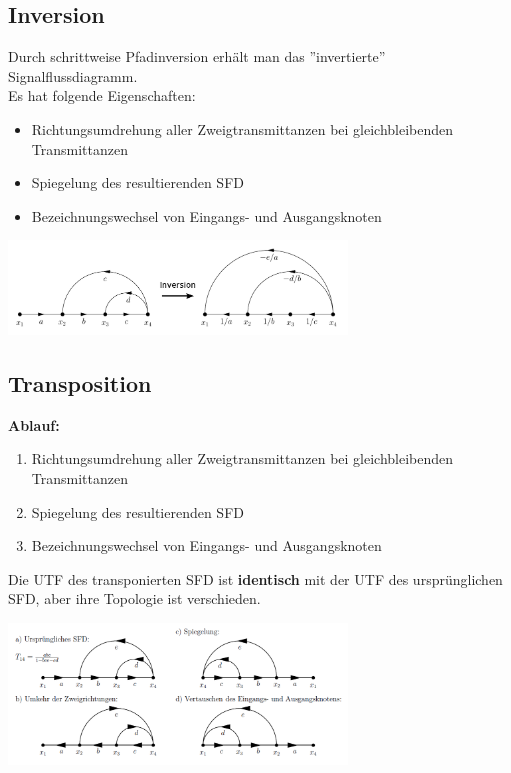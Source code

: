 \subsection{Inversion }
	Durch schrittweise Pfadinversion erhält man das ”invertierte” Signalflussdiagramm. \\
	Es hat folgende Eigenschaften:
	\begin{multicols}{2}
		\begin{itemize}
			\item Richtungsumdrehung aller Zweigtransmittanzen bei gleichbleibenden Transmittanzen
			\item Spiegelung des resultierenden SFD
			\item Bezeichnungswechsel von Eingangs- und Ausgangsknoten
		\end{itemize}
		\columnbreak
		\includegraphics[width=9cm]{./bilder/inversion.png}
	\end{multicols}

\subsection{Transposition }
 	\begin{multicols}{2}
		\textbf{Ablauf:}
		\begin{enumerate}
		  \item Richtungsumdrehung aller Zweigtransmittanzen bei gleichbleibenden Transmittanzen
		  \item Spiegelung des resultierenden SFD
		  \item Bezeichnungswechsel von Eingangs- und Ausgangsknoten
		\end{enumerate}
    
    Die UTF des transponierten SFD ist \textbf{identisch} mit der UTF des ursprünglichen SFD, aber ihre
    Topologie ist verschieden.
    
  \columnbreak
    \includegraphics[width=9cm]{./bilder/transposition.png}
  \end{multicols}

